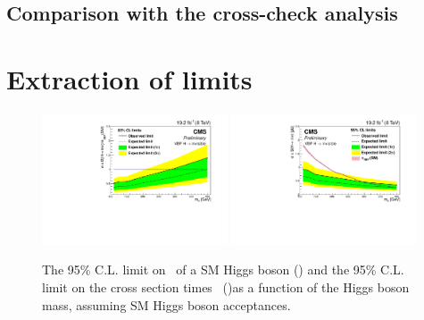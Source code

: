 \subsection{Comparison with the cross-check analysis}

\section{Extraction of limits}

\begin{figure}[h!]
  \begin{center}
    \includegraphics[width=0.49\textwidth]{Chapter07/Images/vbflimit.pdf} %
    \includegraphics[width=0.49\textwidth]{Chapter07/Images/vbfxslimit.pdf}
 \caption{The 95\% C.L. limit on \BRinv\, of a SM Higgs
boson (\cmsLeft) and the 95\% C.L. limit on the cross section times
\BRinv\, (\cmsRight)as a function of the Higgs
boson mass, assuming SM Higgs boson acceptances.}
    \label{fig:limits}
  \end{center}
\end{figure}


